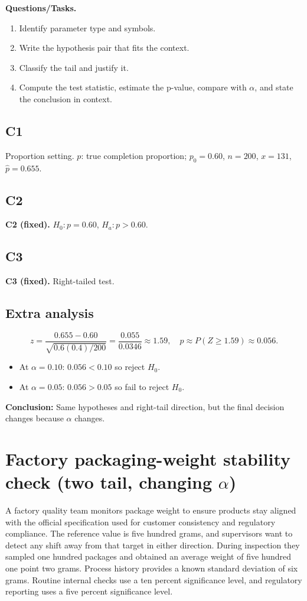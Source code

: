 \textbf{Questions/Tasks.}
\begin{enumerate}
    \item[(C1)] Identify parameter type and symbols.
    \item[(C2)] Write the hypothesis pair that fits the context.
    \item[(C3)] Classify the tail and justify it.
    \item[(Extra analysis)] Compute the test statistic, estimate the p-value, compare with \(\alpha\), and state the conclusion in context.
\end{enumerate}

\subsection*{C1}
Proportion setting. \(p\): true completion proportion; \(p_0=0.60\), \(n=200\), \(x=131\), \(\hat p=0.655\).

\subsection*{C2}
\textbf{C2 (fixed).} \(H_0:p=0.60\), \(H_a:p>0.60\).

\subsection*{C3}
\textbf{C3 (fixed).} Right-tailed test. \RightTailGraph

\subsection*{Extra analysis}
\[
z=\frac{0.655-0.60}{\sqrt{0.6(0.4)/200}}=\frac{0.055}{0.0346}\approx 1.59,
\quad p\approx P(Z\ge 1.59)\approx 0.056.
\]
\begin{itemize}
\item At \(\alpha=0.10\): \(0.056<0.10\) so reject \(H_0\).
\item At \(\alpha=0.05\): \(0.056>0.05\) so fail to reject \(H_0\).
\end{itemize}

\textbf{Conclusion:} Same hypotheses and right-tail direction, but the final decision changes because \(\alpha\) changes.


\section{Factory packaging-weight stability check (two tail, changing \(\alpha\))}
A factory quality team monitors package weight to ensure products stay aligned with the official specification used for customer consistency and regulatory compliance. The reference value is five hundred grams, and supervisors want to detect any shift away from that target in either direction. During inspection they sampled one hundred packages and obtained an average weight of five hundred one point two grams. Process history provides a known standard deviation of six grams. Routine internal checks use a ten percent significance level, and regulatory reporting uses a five percent significance level.


